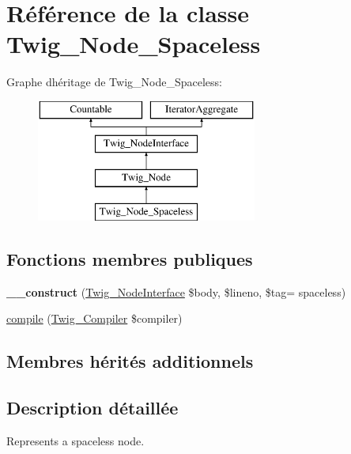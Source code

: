 \hypertarget{class_twig___node___spaceless}{}\section{Référence de la classe Twig\+\_\+\+Node\+\_\+\+Spaceless}
\label{class_twig___node___spaceless}
Graphe d\textquotesingle{}héritage de Twig\+\_\+\+Node\+\_\+\+Spaceless\+:\begin{figure}[H]
\begin{center}
\leavevmode
\includegraphics[height=4.000000cm]{class_twig___node___spaceless}
\end{center}
\end{figure}
\subsection*{Fonctions membres publiques}
\begin{DoxyCompactItemize}
\item 
{\bfseries \+\_\+\+\_\+construct} (\hyperlink{interface_twig___node_interface}{Twig\+\_\+\+Node\+Interface} \$body, \$lineno, \$tag= \textquotesingle{}spaceless\textquotesingle{})\hypertarget{class_twig___node___spaceless_abccde94ca072da2e20cfecfba1bf8f1e}{}\label{class_twig___node___spaceless_abccde94ca072da2e20cfecfba1bf8f1e}

\item 
\hyperlink{class_twig___node___spaceless_a4e0faa87c3fae583620b84d3607085da}{compile} (\hyperlink{class_twig___compiler}{Twig\+\_\+\+Compiler} \$compiler)
\end{DoxyCompactItemize}
\subsection*{Membres hérités additionnels}


\subsection{Description détaillée}
Represents a spaceless node.

